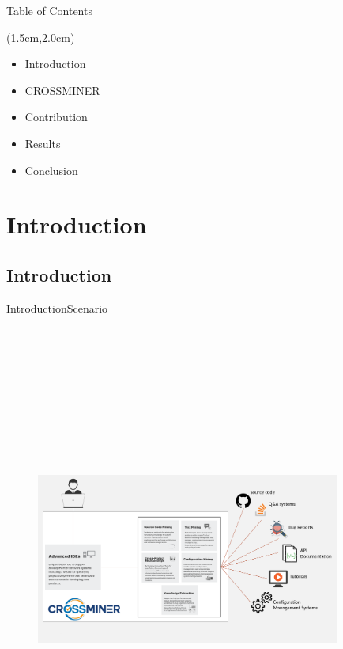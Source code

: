 \documentclass{beamer}
\begin{document}
\begin{frame}{Table of Contents}%

\begin{textblock*}{5.0cm}(1.5cm,2.0cm)
\begin{itemize}
	\item Introduction
	\item CROSSMINER
	\item Contribution
	\item Results
	\item Conclusion
\end{itemize}

\end{textblock*}
\end{frame}

\section{Introduction}
\subsection{Introduction}

\begin{frame}{Introduction}{Scenario}
	\begin{figure}[!h]
	\includegraphics[width=10cm,height=15.5cm,keepaspectratio]{images/scenario.png}
	\centering
	\label{fig:Scenario}
	\end{figure}
\end{frame}
\end{document}
